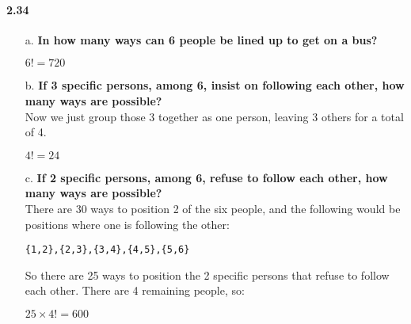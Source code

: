 \documentclass{article}
\begin{document}
\paragraph{2.34}
\begin{enumerate}
\item[a.] \textbf{In how many ways can 6 people be lined up to get on a bus?}\\
\begin{center}
$\boxed{6! = 720}$
\end{center}
\item[b.] \textbf{If 3 specific persons, among 6, insist on following each other, how many 
ways are possible?}\\
Now we just group those 3 together as one person, leaving 3 others for a total of 4.
\begin{center}
$\boxed{4! = 24}$
\end{center}
\item[c.] \textbf{If 2 specific persons, among 6, refuse to follow each other, how many 
ways are possible?}\\
There are 30 ways to position 2 of the six people, and the following would be positions
where one is following the other:
\begin{verbatim}
{1,2},{2,3},{3,4},{4,5},{5,6}
\end{verbatim}
So there are 25 ways to position the 2 specific persons that refuse to follow each other.
There are 4 remaining people, so:
\begin{center}
$\boxed{25 \times 4! = 600}$
\end{center}
\end{enumerate}
\end{document}
